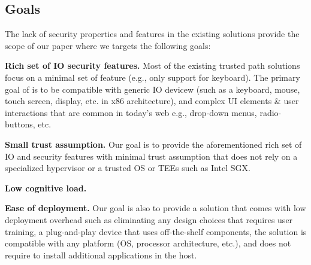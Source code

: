 \subsection{Goals}
\label{sec:problemStatement:goals}

The lack of security properties and features in the existing solutions provide the scope of our paper where we targets the following goals:

\begin{mylist}
  \item  \textbf{Rich set of IO security features.} Most of the existing trusted path solutions focus on a minimal set of feature (e.g., only support for keyboard). The primary goal of \name is to be compatible with generic IO devicew (such as a keyboard, mouse, touch screen, display, etc. in x86 architecture), and complex UI elements \& user interactions that are common in today's web e.g., drop-down menus, radio-buttons, etc. 
  
  \item  \textbf{Small trust assumption.} Our goal is to provide the aforementioned rich set of IO and security features with minimal trust assumption that does not rely on a specialized hypervisor or a trusted OS  or TEEs such as Intel SGX. %
  

  
  \item \textbf{Low cognitive load.} 
  
    \item \textbf{Ease of deployment.} Our goal is also to provide a solution that comes with low deployment overhead such as eliminating any design choices that requires user training, a plug-and-play device that uses off-the-shelf components, the solution is compatible with any platform (OS, processor architecture, etc.), and does not require to install additional applications in the host.

\end{mylist}

